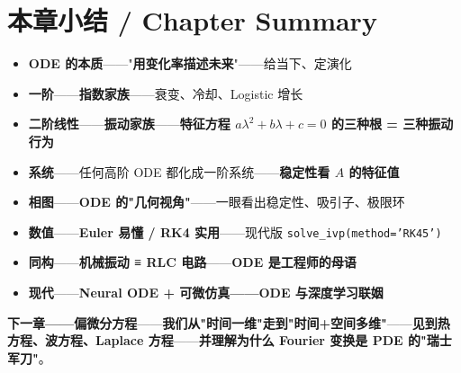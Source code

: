 \section{本章小结 / Chapter Summary}

\begin{tcolorbox}[essbox={本章核心}]
\begin{itemize}
\item \textbf{ODE 的本质}——"\textbf{用变化率描述未来}"——给当下、定演化
\item \textbf{一阶}——\textbf{指数家族}——衰变、冷却、Logistic 增长
\item \textbf{二阶线性}——\textbf{振动家族}——\textbf{特征方程 $a\lambda^2+b\lambda+c=0$ 的三种根 = 三种振动行为}
\item \textbf{系统}——任何高阶 ODE 都化成一阶系统——\textbf{稳定性看 $A$ 的特征值}
\item \textbf{相图}——\textbf{ODE 的"几何视角"}——一眼看出稳定性、吸引子、极限环
\item \textbf{数值}——\textbf{Euler 易懂 / RK4 实用}——现代版 \texttt{solve\_ivp(method='RK45')}
\item \textbf{同构}——\textbf{机械振动 ≡ RLC 电路}——\textbf{ODE 是工程师的母语}
\item \textbf{现代}——\textbf{Neural ODE + 可微仿真——ODE 与深度学习联姻}
\end{itemize}
\end{tcolorbox}

\textbf{下一章——偏微分方程}——\textbf{我们从"时间一维"走到"时间+空间多维"}——\textbf{见到\textbf{热方程、波方程、Laplace 方程}}——\textbf{并理解为什么 Fourier 变换是 PDE 的"瑞士军刀"}。

\clearpage
